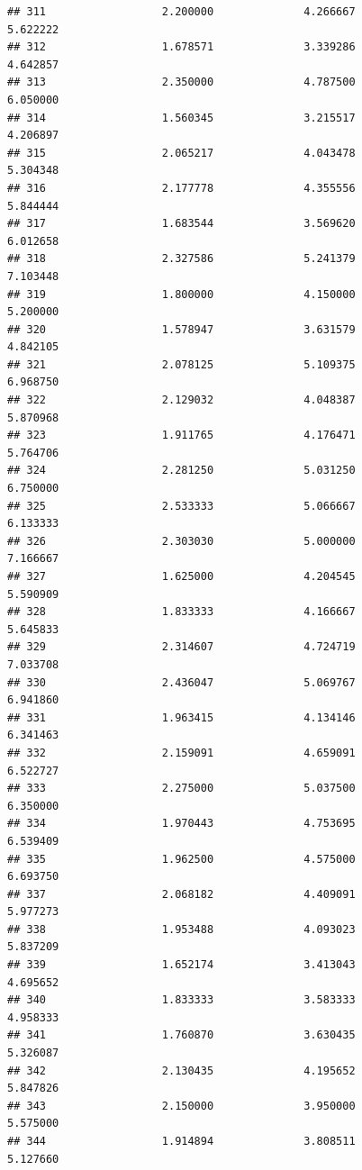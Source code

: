 \documentclass[]{article}
\begin{document}
\begin{verbatim}
## 311                  2.200000              4.266667                 5.622222
## 312                  1.678571              3.339286                 4.642857
## 313                  2.350000              4.787500                 6.050000
## 314                  1.560345              3.215517                 4.206897
## 315                  2.065217              4.043478                 5.304348
## 316                  2.177778              4.355556                 5.844444
## 317                  1.683544              3.569620                 6.012658
## 318                  2.327586              5.241379                 7.103448
## 319                  1.800000              4.150000                 5.200000
## 320                  1.578947              3.631579                 4.842105
## 321                  2.078125              5.109375                 6.968750
## 322                  2.129032              4.048387                 5.870968
## 323                  1.911765              4.176471                 5.764706
## 324                  2.281250              5.031250                 6.750000
## 325                  2.533333              5.066667                 6.133333
## 326                  2.303030              5.000000                 7.166667
## 327                  1.625000              4.204545                 5.590909
## 328                  1.833333              4.166667                 5.645833
## 329                  2.314607              4.724719                 7.033708
## 330                  2.436047              5.069767                 6.941860
## 331                  1.963415              4.134146                 6.341463
## 332                  2.159091              4.659091                 6.522727
## 333                  2.275000              5.037500                 6.350000
## 334                  1.970443              4.753695                 6.539409
## 335                  1.962500              4.575000                 6.693750
## 337                  2.068182              4.409091                 5.977273
## 338                  1.953488              4.093023                 5.837209
## 339                  1.652174              3.413043                 4.695652
## 340                  1.833333              3.583333                 4.958333
## 341                  1.760870              3.630435                 5.326087
## 342                  2.130435              4.195652                 5.847826
## 343                  2.150000              3.950000                 5.575000
## 344                  1.914894              3.808511                 5.127660

\end{verbatim}
\end{document}
